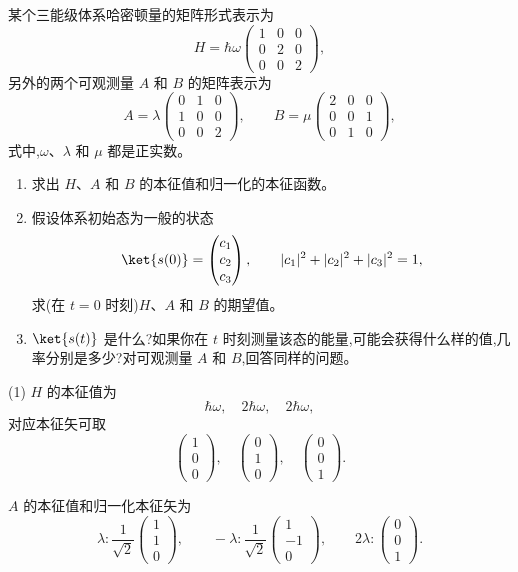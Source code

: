 \begin{question}
某个三能级体系哈密顿量的矩阵形式表示为
\[
H=\hbar\omega\begin{pmatrix}
1&0&0\\
0&2&0\\
0&0&2
\end{pmatrix},
\]
另外的两个可观测量 $A$ 和 $B$ 的矩阵表示为
\[
A=\lambda\begin{pmatrix}
0&1&0\\
1&0&0\\
0&0&2
\end{pmatrix},
\qquad
B=\mu\begin{pmatrix}
2&0&0\\
0&0&1\\
0&1&0
\end{pmatrix},
\]
式中,$\omega$、$\lambda$ 和 $\mu$ 都是正实数。
\begin{enumerate}
\item 求出 $H$、$A$ 和 $B$ 的本征值和归一化的本征函数。
\item 假设体系初始态为一般的状态
\[
\ket{s(0)}=\begin{pmatrix}c_1\\c_2\\c_3\end{pmatrix},
\qquad |c_1|^2+|c_2|^2+|c_3|^2=1,
\]
求(在 $t=0$ 时刻)$H$、$A$ 和 $B$ 的期望值。
\item $\ket{s(t)}$ 是什么?如果你在 $t$ 时刻测量该态的能量,可能会获得什么样的值,几率分别是多少?对可观测量 $A$ 和 $B$,回答同样的问题。
\end{enumerate}
\begin{solution}
(1) $H$ 的本征值为
\[
\hbar\omega,
\quad 2\hbar\omega,
\quad 2\hbar\omega,
\]
对应本征矢可取
\[
\begin{pmatrix}1\\0\\0\end{pmatrix},
\quad
\begin{pmatrix}0\\1\\0\end{pmatrix},
\quad
\begin{pmatrix}0\\0\\1\end{pmatrix}.
\]

$A$ 的本征值和归一化本征矢为
\[
\lambda:\frac1{\sqrt2}\begin{pmatrix}1\\1\\0\end{pmatrix},
\qquad
-\lambda:\frac1{\sqrt2}\begin{pmatrix}1\\-1\\0\end{pmatrix},
\qquad
2\lambda:\begin{pmatrix}0\\0\\1\end{pmatrix}.
\]


\end{solution}
\end{question}
